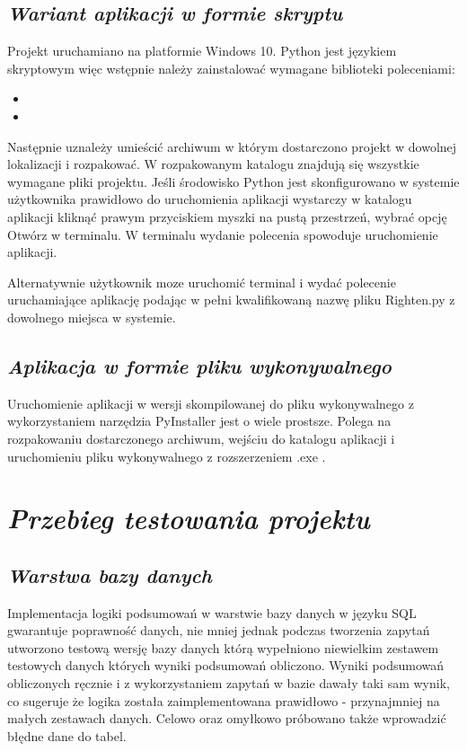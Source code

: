 \documentclass[a4paper,10pt, twoside]{report}
\newcommand{\customstylechapter}[1]{\large{\textit{#1}}}
\newcommand{\customstylesection}[1]{\textbf{\textit{#1}}}
\begin{document}
\section{\customstylesection{Wariant aplikacji w formie skryptu}}
{Projekt uruchamiano na platformie Windows 10. Python jest językiem skryptowym 
więc wstępnie należy zainstalować wymagane biblioteki poleceniami:}
\begin{itemize}
    \item {}
    \item {}
\end{itemize}
{Następnie uznależy umieścić archiwum w którym dostarczono projekt w dowolnej 
lokalizacji i rozpakować. W rozpakowanym katalogu znajdują się wszystkie 
wymagane pliki projektu. Jeśli środowisko Python jest skonfigurowano w systemie 
użytkownika prawidłowo do uruchomienia aplikacji wystarczy w katalogu 
aplikacji kliknąć prawym przyciskiem myszki na pustą przestrzeń, wybrać opcję 
Otwórz w terminalu. W terminalu wydanie polecenia 
 spowoduje uruchomienie aplikacji.}

{Alternatywnie użytkownik moze uruchomić terminal i wydać polecenie 
uruchamiające aplikację podając w pełni kwalifikowaną nazwę pliku Righten.py z 
dowolnego miejsca w systemie.}

\section{\customstylesection{Aplikacja w formie pliku wykonywalnego}}
{Uruchomienie aplikacji w wersji skompilowanej do pliku wykonywalnego z 
wykorzystaniem narzędzia PyInstaller \cite[text]{PyInstaller} jest o wiele 
prostsze. Polega na rozpakowaniu dostarczonego archiwum, wejściu do katalogu 
aplikacji i uruchomieniu pliku wykonywalnego z rozszerzeniem .exe .}

\chapter{\customstylechapter{Przebieg testowania projektu}}
\section{\customstylesection{Warstwa bazy danych}}
{Implementacja logiki podsumowań w warstwie bazy danych w języku SQL gwarantuje 
poprawność danych, nie mniej jednak podczas tworzenia zapytań utworzono testową 
wersję bazy danych którą wypełniono niewielkim zestawem testowych danych których
 wyniki podsumowań obliczono. Wyniki podsumowań obliczonych ręcznie i z 
wykorzystaniem zapytań w bazie dawały taki sam wynik, co sugeruje że logika 
została zaimplementowana prawidłowo - przynajmniej na małych zestawach danych. 
Celowo oraz omyłkowo próbowano także wprowadzić błędne dane do tabel.}
\end{document}
